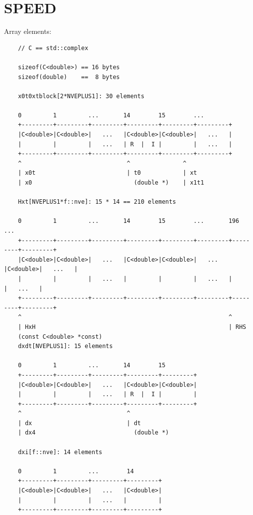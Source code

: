 \section{SPEED}

Array elements:
\tiny\begin{verbatim}
    // C == std::complex

    sizeof(C<double>) == 16 bytes
    sizeof(double)    ==  8 bytes

    x0t0xtblock[2*NVEPLUS1]: 30 elements

    0         1         ...       14        15        ...
    +---------+---------+---------+---------+---------+---------+
    |C<double>|C<double>|   ...   |C<double>|C<double>|   ...   |
    |         |         |   ...   | R  |  I |         |   ...   |
    +---------+---------+---------+---------+---------+---------+
    ^                              ^               ^
    | x0t                          | t0            | xt
    | x0                             (double *)    | x1t1

    Hxt[NVEPLUS1*f::nve]: 15 * 14 == 210 elements

    0         1         ...       14        15        ...       196       ...
    +---------+---------+---------+---------+---------+---------+---------+---------+
    |C<double>|C<double>|   ...   |C<double>|C<double>|   ...   |C<double>|   ...   |
    |         |         |   ...   |         |         |   ...   |         |   ...   |
    +---------+---------+---------+---------+---------+---------+---------+---------+
    ^                                                           ^
    | HxH                                                       | RHS
    (const C<double> *const)
    dxdt[NVEPLUS1]: 15 elements

    0         1         ...       14        15
    +---------+---------+---------+---------+---------+
    |C<double>|C<double>|   ...   |C<double>|C<double>|
    |         |         |   ...   | R  |  I |         |
    +---------+---------+---------+---------+---------+
    ^                              ^
    | dx                           | dt
    | dx4                            (double *)

    dxi[f::nve]: 14 elements

    0         1         ...        14
    +---------+---------+---------+---------+
    |C<double>|C<double>|   ...   |C<double>|
    |         |         |   ...   |         |
    +---------+---------+---------+---------+

\end{verbatim}
\normalsize

